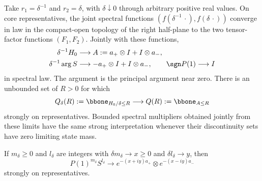 \begin{proposition}\label{prop:two-scale}
Take $r_1=\delta^{-1}$ and $r_2=\delta$, with $\delta\downarrow0$ through
arbitrary positive real values. On core representatives, the joint spectral
functions $(f(\delta^{-1}\,\cdot),f(\delta\,\cdot))$ converge in law in
the compact-open topology of the right half-plane to the two tensor-factor
functions $(F_1,F_2)$. Jointly with these functions,
\begin{equation}\label{eq:chiral-scaled-spectrum}
\begin{split}
 \delta^{-1}H_0&\longrightarrow A:=a_+\otimes I+I\otimes a_-,\\
 \delta^{-1}\arg S&\longrightarrow -a_+\otimes I+I\otimes a_-,
       \qquad \sgn P(1)\longrightarrow I
\end{split}
\end{equation}
in spectral law. The argument is the principal argument near zero.
There is an unbounded set of $R>0$ for which
\begin{equation}\label{eq:chiral-band-limit}
 Q_\delta(R):=\bbone_{H_0/\delta\le R}
                       \longrightarrow Q(R):=\bbone_{A\le R}
\end{equation}
strongly on representatives. Bounded spectral multipliers obtained jointly
from these limits have the same strong interpretation whenever their
discontinuity sets have zero limiting state mass.

If $m_\delta\ge0$ and $l_\delta$ are integers with
$\delta m_\delta\to x\ge0$ and $\delta l_\delta\to y$, then
\begin{equation}\label{eq:chiral-semigroup-limit}
 P(1)^{m_\delta}S^{l_\delta}\longrightarrow
       e^{-(x+iy)a_+}\otimes e^{-(x-iy)a_-}
\end{equation}
strongly on representatives.
\end{proposition}

